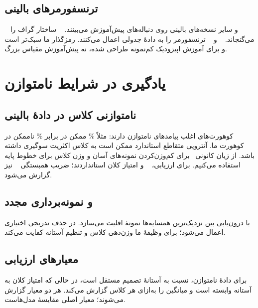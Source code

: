 \subsection{ترنسفورمرهای بالینی}

~\cite{li2020behrt} و سایر نسخه‌های  بالینی روی دنباله‌های  پیش‌آموزش می‌بینند. ~\cite{shang2020gbert} ساختار گراف را می‌گنجاند. ~\cite{huang2020tabtransformer} و ~\cite{somepalli2021saint} ترنسفورمر را به دادۀ جدولی اعمال می‌کنند. رمزگذار  ما سبک‌تر است و برای آموزش اپیزودیک کم‌نمونه طراحی شده، نه پیش‌آموزش مقیاس بزرگ.

\section{یادگیری در شرایط نامتوازن}

\subsection{نامتوازنی کلاس در دادۀ بالینی}

کوهورت‌های  اغلب پیامدهای نامتوازن دارند: مثلاً \% ممکن در برابر \% ناممکن در کوهورت ما. آنتروپی متقاطع استاندارد ممکن است به کلاس اکثریت سوگیری داشته باشد. از زیان کانونی~\cite{lin2017focal} برای کم‌وزن‌کردن نمونه‌های آسان و وزن کلاس برای خطوط پایه استفاده می‌کنیم. برای ارزیابی، ~\cite{hanley1982meaning} و امتیاز  کلان استانداردند؛ ضریب همبستگی ~\cite{matthews1975comparison} نیز گزارش می‌شود.

\subsection{ و نمونه‌برداری مجدد}

 با درون‌یابی بین نزدیک‌ترین همسایه‌ها نمونۀ اقلیت می‌سازد. در حذف تدریجی اختیاری  اعمال می‌شود؛ برای وظیفۀ ما وزن‌دهی کلاس و تنظیم آستانه کفایت می‌کند.

\subsection{معیارهای ارزیابی}

برای دادۀ نامتوازن،  نسبت به آستانۀ تصمیم مستقل است، در حالی که امتیاز  کلان به آستانه وابسته است و میانگین  را به‌ازای هر کلاس گزارش می‌کند. هر دو معیار گزارش می‌شوند؛  معیار اصلی مقایسۀ مدل‌هاست.

